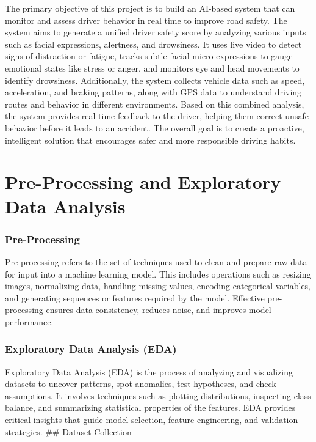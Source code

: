 \documentclass[
  letterpaper,
  DIV=11,
  numbers=noendperiod]{scrreport}
\begin{document}
The primary objective of this project is to build an AI-based system
that can monitor and assess driver behavior in real time to improve road
safety. The system aims to generate a unified driver safety score by
analyzing various inputs such as facial expressions, alertness, and
drowsiness. It uses live video to detect signs of distraction or
fatigue, tracks subtle facial micro-expressions to gauge emotional
states like stress or anger, and monitors eye and head movements to
identify drowsiness. Additionally, the system collects vehicle data such
as speed, acceleration, and braking patterns, along with GPS data to
understand driving routes and behavior in different environments. Based
on this combined analysis, the system provides real-time feedback to the
driver, helping them correct unsafe behavior before it leads to an
accident. The overall goal is to create a proactive, intelligent
solution that encourages safer and more responsible driving habits.


\chapter{Pre-Processing and Exploratory Data
Analysis}\label{pre-processing-and-exploratory-data-analysis}

\subsection{Pre-Processing}\label{pre-processing}

Pre-processing refers to the set of techniques used to clean and prepare
raw data for input into a machine learning model. This includes
operations such as resizing images, normalizing data, handling missing
values, encoding categorical variables, and generating sequences or
features required by the model. Effective pre-processing ensures data
consistency, reduces noise, and improves model performance.

\subsection{Exploratory Data Analysis
(EDA)}\label{exploratory-data-analysis-eda}

Exploratory Data Analysis (EDA) is the process of analyzing and
visualizing datasets to uncover patterns, spot anomalies, test
hypotheses, and check assumptions. It involves techniques such as
plotting distributions, inspecting class balance, and summarizing
statistical properties of the features. EDA provides critical insights
that guide model selection, feature engineering, and validation
strategies. \#\# Dataset Collection
\end{document}
